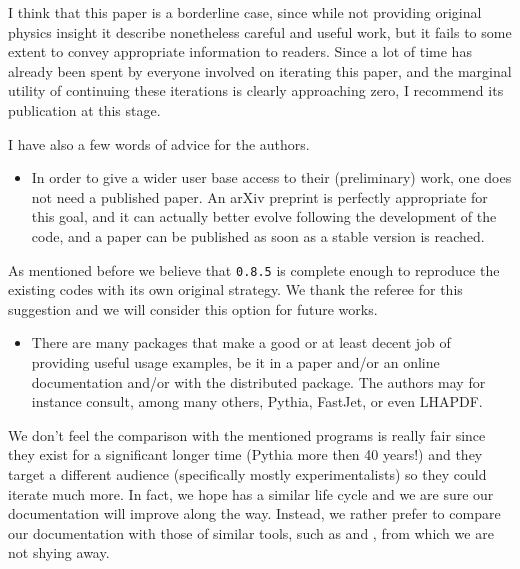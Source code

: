\documentclass[a4paper,11pt]{article}
\begin{document}
\begin{response}{
  I think that this paper is a borderline case, since while not providing
  original physics insight it describe nonetheless careful and useful work, but
  it fails to some extent to convey appropriate information to readers. Since a
  lot of time has already been spent by everyone involved on iterating this
  paper, and the marginal utility of continuing these iterations is clearly
  approaching zero, I recommend its publication at this stage.

  I have also a few words of advice for the authors.

  \begin{itemize}
    \item In order to give a wider user base access to their (preliminary)
      work, one does not need a published paper. An arXiv preprint is perfectly
      appropriate for this goal, and it can actually better evolve following
      the development of the code, and a paper can be published as soon as a
      stable version is reached.
  \end{itemize}
}
As mentioned before we believe that \eko{} \texttt{0.8.5} is complete enough to reproduce 
the existing codes with its own original strategy.
We thank the referee for this suggestion and we will consider this option
for future works.

\end{response}

\begin{response}{
  \begin{itemize}
    \item There are many packages that make a good or at least decent job of
      providing useful usage examples, be it in a paper and/or an online
      documentation and/or with the distributed package. The authors may for
      instance consult, among many others, Pythia, FastJet, or even LHAPDF.
  \end{itemize}
}
We don't feel the comparison with the mentioned programs is really fair
since they exist for a significant longer time (Pythia more then 40 years!)
and they target a different audience (specifically mostly experimentalists)
so they could iterate much more. In fact, we hope \eko{} has a similar life cycle
and we are sure our documentation will improve along the way. Instead, we rather
prefer to compare our documentation with those of similar tools, such as
\apfel{} and \pegasus{}, from which we are not shying away.
\end{response}
\end{document}
